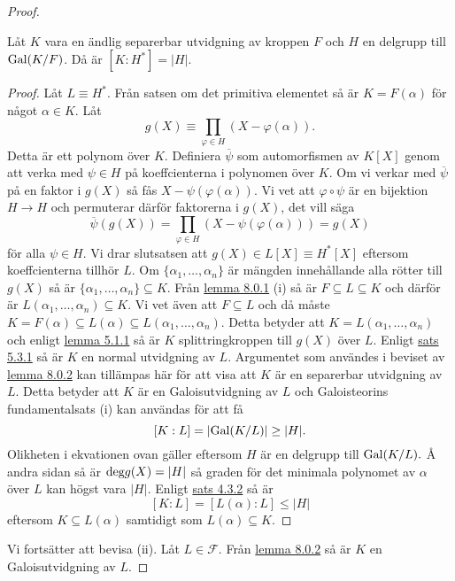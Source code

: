 \documentclass{article}
\newcommand{\grad}[0]{\textnormal{deg}}
\newcommand{\gal}[0]{\textnormal{Gal}}
\theoremstyle{definition}
\begin{document}
\begin{proof}
  \hypertarget{lemma9.0.4}{}
  \begin{mylemma}{}{}
    Låt $K$ vara en ändlig separerbar utvidgning av kroppen $F$ och $H$ en delgrupp till $\gal(K/F)$. Då är $[K:H^*] = |H|.$
  \end{mylemma}
  
  \begin{proof}
    Låt $L \equiv H^*$. Från satsen om det primitiva elementet så är $K = F(\alpha)$ för något $\alpha \in K$. Låt 
    \[g(X) \equiv \prod_{\varphi \in H} (X - \varphi(\alpha)).  \]
    Detta är ett polynom över $K$. Definiera $\overline{\psi}$ som automorfismen av $K[X]$ genom att verka med $\psi \in H$ på koeffcienterna i polynomen över $K$.
    Om vi verkar med $\overline{\psi}$ på en faktor i $g(X)$ så fås $X - \psi(\varphi(\alpha))$. Vi vet att $\varphi \circ \psi$ är en bijektion $H \rightarrow H$ 
    och permuterar därför faktorerna i $g(X)$, det vill säga 
    \[\overline{\psi}(g(X)) = \prod_{\varphi \in H} (X - \psi(\varphi(\alpha))) = g(X)  \]
    för alla $\psi \in H$. Vi drar slutsatsen att $g(X) \in L[X] \equiv H^*[X]$ eftersom koeffcienterna tillhör $L$. Om 
    $\{\alpha_1, \ldots, \alpha_n\}$ är mängden innehållande alla rötter till $g(X)$ så är $\{\alpha_1, \ldots, \alpha_n\} \subseteq K.$ 
    Från \hyperlink{lemma9.0.1}{lemma 8.0.1} (i) så är $F \subseteq L \subseteq K$ och därför är $L(\alpha_1, \ldots, \alpha_n) \subseteq K$.
    Vi vet även att $F \subseteq L$ och då måste $K = F(\alpha) \subseteq L(\alpha) \subseteq L(\alpha_1, \ldots, \alpha_n)$. Detta betyder att 
    $K = L(\alpha_1, \ldots, \alpha_n)$ och enligt \hyperlink{lemma6.0.1}{lemma 5.1.1} så är $K$ splittringkroppen till $g(X)$ över $L$.
    Enligt \hyperlink{sats6.3.1}{sats 5.3.1} så är $K$ en normal utvidgning av $L$. Argumentet som användes i beviset av \hyperlink{lemma9.0.2}{lemma 8.0.2}
    kan tillämpas här för att visa att $K$ är en separerbar utvidgning av $L$. Detta betyder att $K$ är en Galoisutvidgning av $L$
    och Galoisteorins fundamentalsats (i) kan användas för att få 
    \[ [K:L] = |\gal(K/L)| \geq |H|.\]
    Olikheten i ekvationen ovan gäller eftersom $H$ är en delgrupp till $\gal(K/L).$ Å andra sidan så är $\grad g(X) = |H|$ så graden för det minimala 
    polynomet av $\alpha$ över $L$ kan högst vara $|H|$. Enligt \hyperlink{5.3.2}{sats 4.3.2} så är 
    \[ [K:L] = [L(\alpha):L] \leq |H| \]
    eftersom $K \subseteq L(\alpha)$ samtidigt som $L(\alpha) \subseteq K$.
  \end{proof}
  Vi fortsätter att bevisa (ii). Låt $L \in \mathcal{F}$. Från \hyperlink{lemma9.0.2}{lemma 8.0.2} så är $K$ en Galoisutvidgning av $L$. 

\end{proof}
\end{document}
